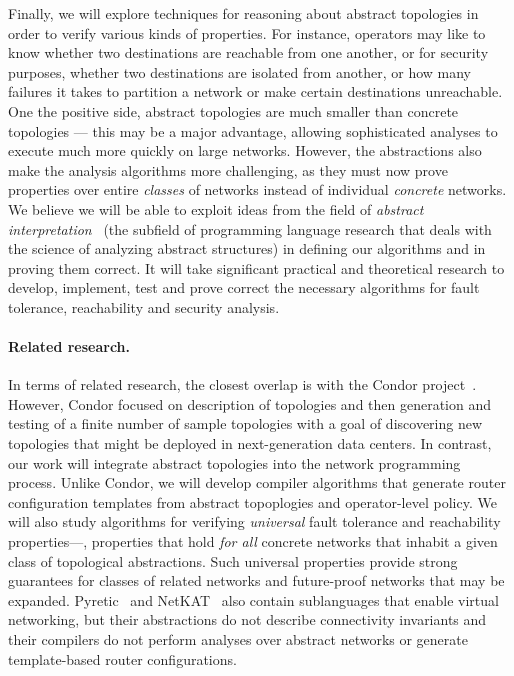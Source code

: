 Finally, we will explore techniques for reasoning about abstract topologies in order to verify various kinds of properties.
For instance, operators may like to know whether two destinations
are reachable from one another, or for security purposes, whether
two destinations are isolated from another, or how many failures
it takes to partition a network or make certain destinations unreachable.
One the positive side, abstract topologies are much smaller than concrete
topologies --- this may be a major advantage, allowing sophisticated 
analyses to execute much more quickly on large networks.  However, the
abstractions also make the analysis algorithms more challenging, as they must now prove properties over entire \emph{classes} of networks instead of
individual \emph{concrete} networks.  We believe we will be able to exploit
ideas from the field of \emph{abstract interpretation}~\cite{cousot+:ai} (the subfield of
programming language research that deals with the science 
of analyzing abstract structures) in defining our algorithms and in proving
them correct.  It will take significant practical and theoretical
research to develop, implement, test and prove correct the necessary 
algorithms for fault tolerance, reachability and security analysis.


\paragraph*{Related research.}
In terms of related research, the closest overlap is with the 
Condor project~\cite{condor}.  However, Condor focused on description
of topologies and then generation and testing of a finite number of
sample topologies with a goal of discovering new topologies that might be 
deployed in next-generation data centers.
In contrast, our work will integrate abstract topologies into the
network programming process. Unlike Condor,
we will develop
compiler algorithms that generate router configuration templates from
abstract topoplogies and operator-level policy.  We will also 
study algorithms for verifying \emph{universal}
fault tolerance and reachability properties---\ie, properties that
hold \emph{for all} concrete
networks that inhabit a given class of topological abstractions.  Such
universal properties provide strong guarantees for classes of
related networks and future-proof networks
that may be expanded.  
Pyretic~\cite{pyretic} and NetKAT~\cite{fast-compiler} also contain sublanguages
that enable virtual networking, but their abstractions do not describe
connectivity invariants and their compilers do not perform analyses over
abstract networks or generate template-based router configurations.

